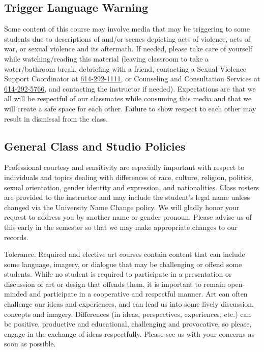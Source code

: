 \documentclass[12pt,letter,english]{report}
\begin{document}
\subsection{Trigger Language Warning}

Some content of this course may involve media that may be triggering to some students due to descriptions of and/or scenes depicting acts of violence, acts of war, or sexual violence and its aftermath. If needed, please take care of yourself while watching/reading this material (leaving classroom to take a water/bathroom break, debriefing with a friend, contacting a Sexual Violence Support Coordinator at \href{tel:6142921111}{614-292-1111}, or Counseling and Consultation Services at \href{tel:6142925766}{614-292-5766}, and contacting the instructor if needed). Expectations are that we all will be respectful of our classmates while consuming this media and that we will create a safe space for each other. Failure to show respect to each other may result in dismissal from the class.

\subsection{General Class and Studio Policies}

Professional courtesy and sensitivity are especially important with respect to individuals and topics dealing with differences of race, culture, religion, politics, sexual orientation, gender identity and expression, and nationalities. Class rosters are provided to the instructor and may include the student's legal name unless changed via the University Name Change policy. We will gladly honor your request to address you by another name or gender pronoun. Please advise us of this early in the semester so that we may make appropriate changes to our records.

Tolerance. Required and elective art courses contain content that can include some language, imagery, or dialogue that may be challenging or offend some students. While no student is required to participate in a presentation or discussion of art or design that offends them, it is important to remain open-minded and participate in a cooperative and respectful manner. Art can often challenge our ideas and experiences, and can lead us into some lively discussion, concepts and imagery. Differences (in ideas, perspectives, experiences, etc.) can be positive, productive and educational, challenging and provocative, so please, engage in the exchange of ideas respectfully. Please see us with your concerns as soon as possible.
\end{document}

